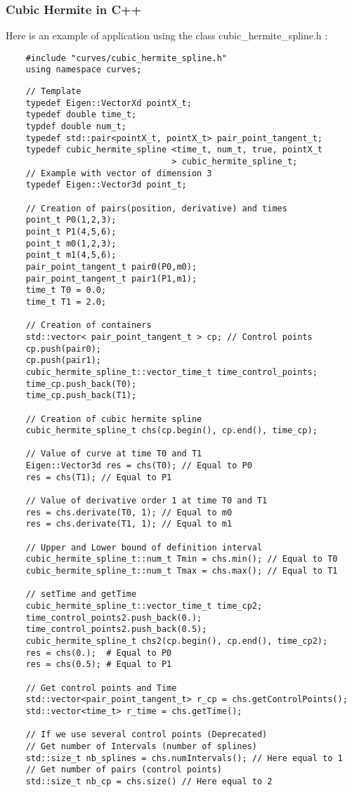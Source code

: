 \documentclass{article}
\begin{document}
    \subsubsection{Cubic Hermite in C++}
    Here is an example of application using the class cubic\_hermite\_spline.h :\\
    \begin{lstlisting}
    #include "curves/cubic_hermite_spline.h"
    using namespace curves;
    \end{lstlisting}
    \begin{lstlisting}
    // Template
    typedef Eigen::VectorXd pointX_t;
    typedef double time_t;
    typdef double num_t;
    typedef std::pair<pointX_t, pointX_t> pair_point_tangent_t;
    typedef cubic_hermite_spline <time_t, num_t, true, pointX_t
                                 > cubic_hermite_spline_t;
    // Example with vector of dimension 3
    typedef Eigen::Vector3d point_t;

    // Creation of pairs(position, derivative) and times
    point_t P0(1,2,3);
    point_t P1(4,5,6);
    point_t m0(1,2,3);
    point_t m1(4,5,6);
    pair_point_tangent_t pair0(P0,m0);
    pair_point_tangent_t pair1(P1,m1);
    time_t T0 = 0.0;
    time_t T1 = 2.0;

    // Creation of containers
    std::vector< pair_point_tangent_t > cp; // Control points
    cp.push(pair0);
    cp.push(pair1);
    cubic_hermite_spline_t::vector_time_t time_control_points;
    time_cp.push_back(T0);
    time_cp.push_back(T1);

    // Creation of cubic hermite spline
    cubic_hermite_spline_t chs(cp.begin(), cp.end(), time_cp);

    // Value of curve at time T0 and T1
    Eigen::Vector3d res = chs(T0); // Equal to P0
    res = chs(T1); // Equal to P1

    // Value of derivative order 1 at time T0 and T1
    res = chs.derivate(T0, 1); // Equal to m0
    res = chs.derivate(T1, 1); // Equal to m1

    // Upper and Lower bound of definition interval
    cubic_hermite_spline_t::num_t Tmin = chs.min(); // Equal to T0
    cubic_hermite_spline_t::num_t Tmax = chs.max(); // Equal to T1

    // setTime and getTime
    cubic_hermite_spline_t::vector_time_t time_cp2;
    time_control_points2.push_back(0.);
    time_control_points2.push_back(0.5);
    cubic_hermite_spline_t chs2(cp.begin(), cp.end(), time_cp2);
    res = chs(0.);  # Equal to P0
    res = chs(0.5); # Equal to P1

    // Get control points and Time
    std::vector<pair_point_tangent_t> r_cp = chs.getControlPoints();
    std::vector<time_t> r_time = chs.getTime();

    // If we use several control points (Deprecated)
    // Get number of Intervals (number of splines)
    std::size_t nb_splines = chs.numIntervals(); // Here equal to 1
    // Get number of pairs (control points)
    std::size_t nb_cp = chs.size() // Here equal to 2
    \end{lstlisting}
\end{document}

